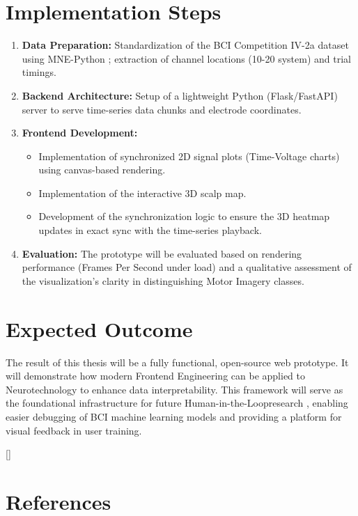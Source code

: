 \section{Implementation Steps}
\begin{enumerate}
    \item \textbf{Data Preparation:} Standardization of the BCI Competition IV-2a dataset using MNE-Python \cite{gramfort2013}; extraction of channel locations (10-20 system) and trial timings.
    \item \textbf{Backend Architecture:} Setup of a lightweight Python (Flask/FastAPI) server to serve time-series data chunks and electrode coordinates.
    \item \textbf{Frontend Development:}
    \begin{itemize}
        \item Implementation of synchronized 2D signal plots (Time-Voltage charts) using canvas-based rendering.
        \item Implementation of the interactive 3D scalp map.
        \item Development of the synchronization logic to ensure the 3D heatmap updates in exact sync with the time-series playback.
    \end{itemize}
    \item \textbf{Evaluation:} The prototype will be evaluated based on rendering performance (Frames Per Second under load) and a qualitative assessment of the visualization's clarity in distinguishing Motor Imagery classes.
\end{enumerate}

\clearpage

\section{Expected Outcome}
The result of this thesis will be a fully functional, open-source web prototype. It will demonstrate how modern Frontend Engineering can be applied to Neurotechnology to enhance data interpretability. This framework will serve as the foundational infrastructure for future \glqq Human-in-the-Loop\grqq \space research \cite{edelman2024}, enabling easier debugging of BCI machine learning models and providing a platform for visual feedback in user training.

\clearpage

[\refname]{%
 \section*{References} %
 \vspace{0.5em} %
}

\printbibliography[heading=customreferences] %


